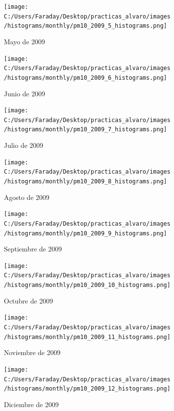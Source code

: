\documentclass[12pt]{article}
\begin{document}
\begin{figure}[H]
\centering
\begin{subfigure}[h]{0.45\textwidth}
\texttt{[image: C:/Users/Faraday/Desktop/practicas\_alvaro/images/histograms/monthly/pm10\_2009\_5\_histograms.png]}
\caption{Mayo de 2009}
\label{fig:hist-mon-3-5-2009}
\end{subfigure}
%
\begin{subfigure}[H]{0.45\textwidth}
\texttt{[image: C:/Users/Faraday/Desktop/practicas\_alvaro/images/histograms/monthly/pm10\_2009\_6\_histograms.png]}
\caption{Junio de 2009}
\label{fig:hist-mon-3-6-2009}
\end{subfigure}
\caption{}
\end{figure}

\newpage

\begin{figure}[H]
\centering
\begin{subfigure}[h]{0.45\textwidth}
\texttt{[image: C:/Users/Faraday/Desktop/practicas\_alvaro/images/histograms/monthly/pm10\_2009\_7\_histograms.png]}
\caption{Julio de 2009}
\label{fig:hist-mon-3-7-2009}
\end{subfigure}
%
\begin{subfigure}[H]{0.45\textwidth}
\texttt{[image: C:/Users/Faraday/Desktop/practicas\_alvaro/images/histograms/monthly/pm10\_2009\_8\_histograms.png]}
\caption{Agosto de 2009}
\label{fig:hist-mon-3-8-2009}
\end{subfigure}
\caption{}
\end{figure}

\begin{figure}[H]
\centering
\begin{subfigure}[h]{0.45\textwidth}
\texttt{[image: C:/Users/Faraday/Desktop/practicas\_alvaro/images/histograms/monthly/pm10\_2009\_9\_histograms.png]}
\caption{Septiembre de 2009}
\label{fig:hist-mon-3-9-2009}
\end{subfigure}
%
\begin{subfigure}[H]{0.45\textwidth}
\texttt{[image: C:/Users/Faraday/Desktop/practicas\_alvaro/images/histograms/monthly/pm10\_2009\_10\_histograms.png]}
\caption{Octubre de 2009}
\label{fig:hist-mon-3-10-2009}
\end{subfigure}
\caption{}
\end{figure}

\begin{figure}[H]
\centering
\begin{subfigure}[h]{0.45\textwidth}
\texttt{[image: C:/Users/Faraday/Desktop/practicas\_alvaro/images/histograms/monthly/pm10\_2009\_11\_histograms.png]}
\caption{Noviembre de 2009}
\label{fig:hist-mon-3-11-2009}
\end{subfigure}
%
\begin{subfigure}[H]{0.45\textwidth}
\texttt{[image: C:/Users/Faraday/Desktop/practicas\_alvaro/images/histograms/monthly/pm10\_2009\_12\_histograms.png]}
\caption{Diciembre de 2009}
\label{fig:hist-mon-3-12-2009}
\end{subfigure}
\caption{}
\end{figure}
\end{document}
